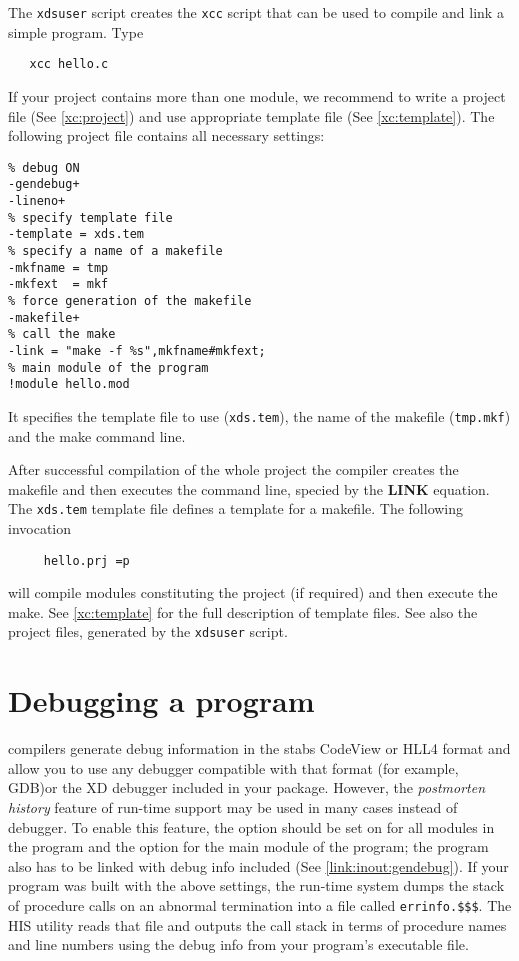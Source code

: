  The {\tt xdsuser} script creates the {\tt xcc} script that can be used
 to compile and link a simple program. Type
 \begin{verbatim}
   xcc hello.c
 \end{verbatim}
If your project contains more than one module, we recommend to
write a project file (See \ref{xc:project}) and use appropriate
template file (See \ref{xc:template}).
The following project file contains all necessary settings:
\begin{verbatim}
% debug ON
-gendebug+
-lineno+
% specify template file
-template = xds.tem
% specify a name of a makefile
-mkfname = tmp
-mkfext  = mkf
% force generation of the makefile
-makefile+
% call the make
-link = "make -f %s",mkfname#mkfext;
% main module of the program
!module hello.mod
\end{verbatim}
It specifies the template file to use ({\tt xds.tem}), the name
of the makefile ({\tt tmp.mkf}) and the make command line.

After successful compilation of the whole project the compiler
creates the makefile and then executes the command line,
specied by the {\bf LINK} equation.
The {\tt xds.tem} template file defines a template for a makefile.
The following invocation

\verb'    '\xc{}\verb' hello.prj =p'

will compile modules constituting the project (if required) and
then execute the make. See \ref{xc:template} for the full description
of template files.
See also the project files, generated by the {\tt xdsuser} script.

\fi %

\section{Debugging a program}\label{start:debug}

\ifgencode

\XDS{} compilers generate debug information in the
\iflinux stabs \else CodeView or HLL4 \fi format and
allow you to use any debugger compatible with that format \iflinux (for
example, GDB)\else or the XD debugger included
in your \XDS{} package\fi.  However,
the {\em postmorten history}
feature of \XDS{} run-time support may be used in many cases instead of
debugger. To enable this feature, the option 
should be set on for all modules in the
program and the option 
for the main module of the program; the program also has to be linked
with debug info included\ifxlink{} (See \ref{link:inout:gendebug})\fi.
If your program was built with the above settings, the run-time system
dumps the stack of procedure calls on an abnormal termination
into a file called \verb'errinfo.$$$'. %
The HIS utility reads that file and outputs the call stack in %
terms of procedure names and line numbers using the debug info
from your program's executable file.

